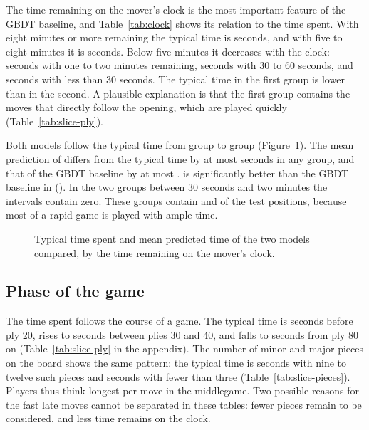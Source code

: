 \documentclass[11pt]{article}
\begin{document}
The time remaining on the mover's clock is the most important feature of the
GBDT baseline, and Table~\ref{tab:clock} shows its relation to the time
spent. With eight minutes or more remaining the typical time is
 seconds, and with five to eight minutes it is
 seconds. Below five minutes it decreases
with the clock:  seconds with one to two
minutes remaining,  seconds with 30 to 60
seconds, and  seconds with less than 30 seconds.
The typical time in the first group is lower than in the second. A plausible
explanation is that the first group contains the moves that directly follow
the opening, which are played quickly (Table~\ref{tab:slice-ply}).

\begin{table}[htbp]\centering\footnotesize
{}
\caption{Test-set results by the time remaining on the mover's clock, in
seconds.}
\label{tab:clock}
\end{table}

Both models follow the typical time from group to group
(Figure~\ref{fig:clock}). The mean prediction of  differs
from the typical time by at most 
seconds in any group, and that of the GBDT baseline by at most
.  is significantly
better than the GBDT baseline in 
(). In the two groups between 30 seconds and two
minutes the intervals contain zero. These groups contain
 and  of the
 test positions, because most of a rapid game is played
with ample time.

\begin{figure}[htbp]\centering
{}
\caption{Typical time spent and mean predicted time of the two models
compared, by the time remaining on the mover's clock.}
\label{fig:clock}
\end{figure}

\subsection{Phase of the game}

The time spent follows the course of a game. The typical time is
 seconds before ply 20, rises to
 seconds between plies 30 and 40, and falls to
 seconds from ply 80 on
(Table~\ref{tab:slice-ply} in the appendix). The number of minor and major
pieces on the board shows the same pattern: the typical time is
 seconds with nine to twelve such pieces and
 seconds with fewer than three
(Table~\ref{tab:slice-pieces}). Players thus think longest per move in the
middlegame. Two possible reasons for the fast late moves cannot be separated
in these tables: fewer pieces remain to be considered, and less time remains
on the clock.
\end{document}
